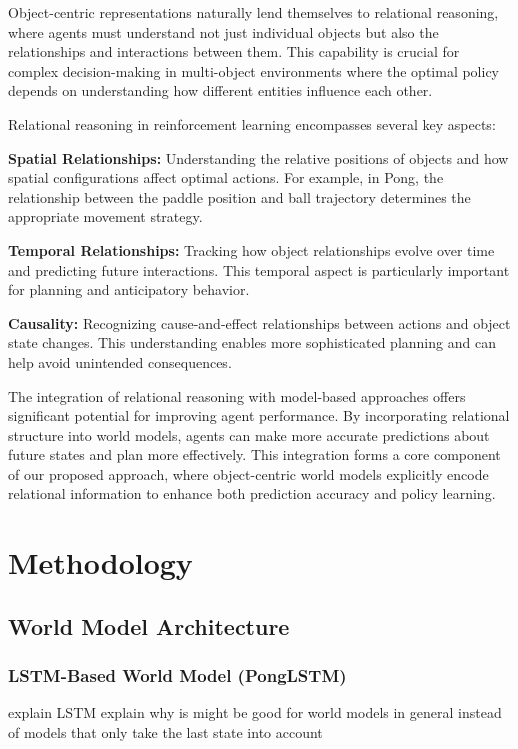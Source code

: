 \documentclass[
	english,
	ruledheaders=section,
	class=report,
	thesis={type=master},
	accentcolor=9c,
	custommargins=true,
	marginpar=false,
	parskip=half-,
	fontsize=11pt,
]{tudapub}
\begin{document}
Object-centric representations naturally lend themselves to relational
reasoning, where agents must understand not just individual objects but also
the relationships and interactions between them. This capability is crucial for
complex decision-making in multi-object environments where the optimal policy
depends on understanding how different entities influence each other.

Relational reasoning in reinforcement learning encompasses several key aspects:

\textbf{Spatial Relationships:} Understanding the relative positions of objects and how spatial configurations affect optimal actions. For example, in Pong, the relationship between the paddle position
and ball trajectory determines the appropriate movement strategy.

\textbf{Temporal Relationships:} Tracking how object relationships evolve over time and predicting future interactions. This temporal aspect is particularly important for planning and anticipatory behavior.

\textbf{Causality:} \cite{scholkopf2021toward,dasgupta2019causal} Recognizing cause-and-effect relationships between actions and object state changes. This understanding enables more sophisticated planning and can help avoid unintended consequences.

The integration of relational reasoning with model-based approaches offers
significant potential for improving agent performance. By incorporating
relational structure into world models, agents can make more accurate
predictions about future states and plan more effectively. This integration
forms a core component of our proposed approach, where object-centric world
models explicitly encode relational information to enhance both prediction
accuracy and policy learning.

\chapter{Methodology}
\label{chap:methodology}

\section{World Model Architecture}
\label{sec:world_model_arch}

\subsection{LSTM-Based World Model (PongLSTM)}
\label{subsec:ponglstm}
explain LSTM
explain why is might be good for world models in general instead of models that only take the last state into account
\end{document}
